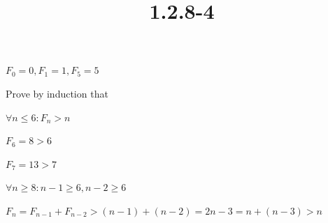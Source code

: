 \documentclass{article}
\title{1.2.8-4}
\begin{document}
\maketitle

$F_0 = 0, F_1 = 1, F_5 = 5$

Prove by induction that

$\forall n \leq 6: F_n > n$

$F_6 = 8 > 6$

$F_7 = 13 > 7$

$\forall n \geq 8: n - 1 \geq 6, n - 2 \geq 6$

$F_n = F_{n-1} + F_{n-2} > (n - 1) + (n - 2) = 2n-3 = n + (n-3) > n$
\end{document}
